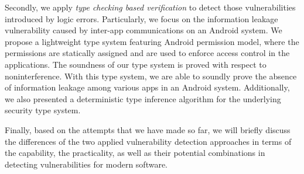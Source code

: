 Secondly, we apply \emph{type checking based verification} to detect those vulnerabilities introduced by logic errors. Particularly, we focus on the information leakage vulnerability caused by inter-app communications on an Android system. 
We propose a lightweight type system featuring Android permission model, where the permissions are statically assigned and are used to enforce access control in the applications. 
The soundness of our type system is proved with respect to noninterference. With this type system, we are able to soundly prove the absence of information leakage among various apps in an Android system.
 Additionally, we also presented a deterministic type inference algorithm for the underlying security type system. 

Finally, based on the attempts that we have made so far, we will briefly discuss the differences of the two applied vulnerability detection approaches in terms of the capability, the practicality, as well as their potential combinations in detecting vulnerabilities for modern software.

